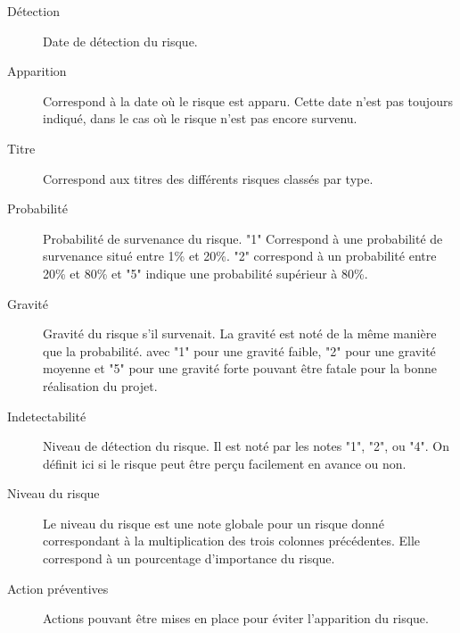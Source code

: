 \documentclass[etudiants]{support-iutrs}
\begin{document}
\begin{description}

\item[Détection]
Date de détection du risque.

\item[Apparition]
Correspond à la date où le risque est apparu. Cette date n'est pas toujours indiqué, dans le cas où le risque n'est pas encore survenu.

\item[Titre]
Correspond aux titres des différents risques classés par type.

\item[Probabilité]
Probabilité de survenance du risque. "1" Correspond à une probabilité de survenance situé entre 1\% et 20\%. "2" correspond à un probabilité entre 20\% et 80\% et "5" indique une probabilité supérieur à 80\%.

\item[Gravité]
Gravité du risque s'il survenait. La gravité est noté de la même manière que la probabilité. avec "1" pour une gravité faible, "2" pour une gravité moyenne et "5" pour une gravité forte pouvant être fatale pour la bonne réalisation du projet.

\item[Indetectabilité]
Niveau de détection du risque. Il est noté par les notes "1", "2", ou "4". On définit ici si le risque peut être perçu facilement en avance ou non.

\item[Niveau du risque]
Le niveau du risque est une note globale pour un risque donné correspondant à la multiplication des trois colonnes précédentes. Elle correspond à un pourcentage d'importance du risque.

\item[Action préventives]
Actions pouvant être mises en place pour éviter l'apparition du risque.
\end{description}
\end{document}
